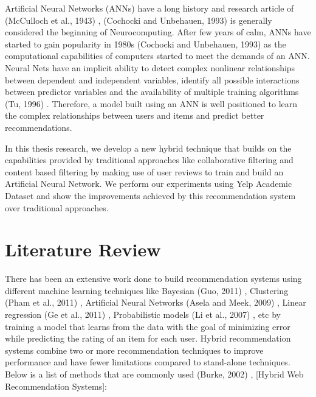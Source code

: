 \documentclass[12pt]{article}
\begin{document}
Artificial Neural Networks (ANNs) have a long history and research article of (McCulloch et al., 1943) \cite{mcculloch}, (Cochocki and Unbehauen, 1993) \cite{cochocki} is generally considered the beginning of Neurocomputing. After few years of calm, ANNs have started to gain popularity in 1980s (Cochocki and Unbehauen, 1993) \cite{cochocki} as the computational capabilities of computers started to meet the demands of an ANN. Neural Nets have an implicit ability to detect complex nonlinear relationships between dependent and independent variables, identify all possible interactions between predictor variables and the availability of multiple training algorithms (Tu, 1996) \cite{tu}. Therefore, a model built using an ANN is well positioned to learn the complex relationships between users and items and predict better recommendations.

In this thesis research, we develop a new hybrid technique that builds on the capabilities provided by traditional approaches like collaborative filtering and content based filtering by making use of user reviews to train and build an Artificial Neural Network. We perform our experiments using Yelp Academic Dataset and show the improvements achieved by this recommendation system over traditional approaches.

\section{Literature Review}

There has been an extensive work done to build recommendation systems using different machine learning techniques like Bayesian (Guo, 2011) \cite{guo}, Clustering (Pham et al., 2011) \cite{pham}, Artificial Neural Networks (Asela and Meek, 2009) \cite{gunawardana}, Linear regression (Ge et al., 2011) \cite{ge}, Probabilistic models (Li et al., 2007) \cite{li}, etc by training a model that learns from the data with the goal of minimizing error while predicting the rating of an item for each user. Hybrid recommendation systems combine two or more recommendation techniques to improve performance and have fewer limitations compared to stand-alone techniques. Below is a list of methods that are commonly used (Burke, 2002) \cite{burke}, [Hybrid Web Recommendation Systems]:
\end{document}
